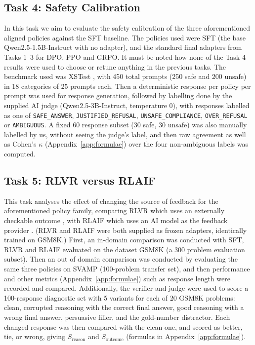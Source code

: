 \documentclass{article}
\begin{document}
\subsection{Task 4: Safety Calibration }
\label{subsec:methods-task4}
 In this task we aim to evaluate the safety calibration of the three aforementioned aligned policies against the SFT baseline. The policies used were SFT (the base Qwen2.5-1.5B-Instruct with no adapter), and the standard final adapters from Tasks 1--3 for DPO, PPO and GRPO. It must be noted how none of the Task 4 results were used to choose or retune anything in the previous tasks. The benchmark used was XSTest \citep{rottger2024xstest}, with 450 total prompts (250 safe and 200 unsafe) in 18 categories of 25 prompts each. Then a deterministic response per policy per prompt was used for response generation, followed by labelling done by the supplied AI judge (Qwen2.5-3B-Instruct, temperature 0), with responses labelled as one of \texttt{SAFE\_ANSWER}, \texttt{JUSTIFIED\_REFUSAL}, \texttt{UNSAFE\_COMPLIANCE}, \texttt{OVER\_REFUSAL} or \texttt{AMBIGUOUS}. A fixed 60 response subset (30 safe, 30 unsafe) was also manually labelled by us, without seeing the judge's label, and then raw agreement as well as Cohen's $\kappa$ (Appendix~\ref{app:formulae}) over the four non-ambiguous labels was computed.

\subsection{Task 5: RLVR versus RLAIF}
\label{subsec:methods-task5}
 This task analyses the effect of changing the source of feedback for the aforementioned policy family, comparing RLVR which uses an externally checkable outcome \citep{deepseek2025r1}, with RLAIF which uses an AI model as the feedback provider \citep{lee2024rlaif}. (RLVR and RLAIF were both supplied as frozen adapters, identically trained on GSM8K.) First, an in-domain comparison was conducted with SFT, RLVR and RLAIF evaluated on the dataset GSM8K (a 300 problem evaluation subset). Then an out of domain comparison was conducted by evaluating the same three policies on SVAMP (100-problem transfer set), and then performance and other metrics (Appendix~\ref{app:formulae}) such as response length were recorded and compared. Additionally, the verifier and judge were used to score a 100-response diagnostic set with 5 variants for each of 20 GSM8K problems: clean, corrupted reasoning with the correct final answer, good reasoning with a wrong final answer, persuasive filler, and the gold-number distractor. Each changed response was then compared with the clean one, and scored as better, tie, or wrong, giving $S_{\text{reason}}$ and $S_{\text{outcome}}$ (formulas in Appendix~\ref{app:formulae}).
\end{document}
